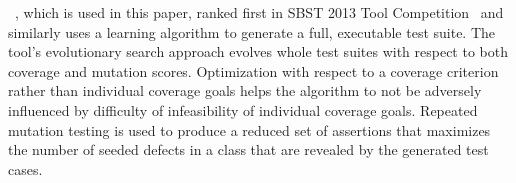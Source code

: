 \evo~\cite{fraser:2011:eat:2025113.2025179}, which is used in this paper, ranked
first in SBST 2013 Tool Competition~\cite{fraser2013a} and similarly uses a
learning algorithm to generate a full, executable test suite.  The tool's
evolutionary search approach evolves whole test suites with respect to both
coverage and mutation scores.  Optimization with respect to a coverage criterion
rather than individual coverage goals helps the algorithm to not be adversely
influenced by difficulty of infeasibility of individual coverage goals.
Repeated mutation testing is used to produce a reduced set of assertions that
maximizes the number of seeded defects in a class that are revealed by the
generated test cases.


